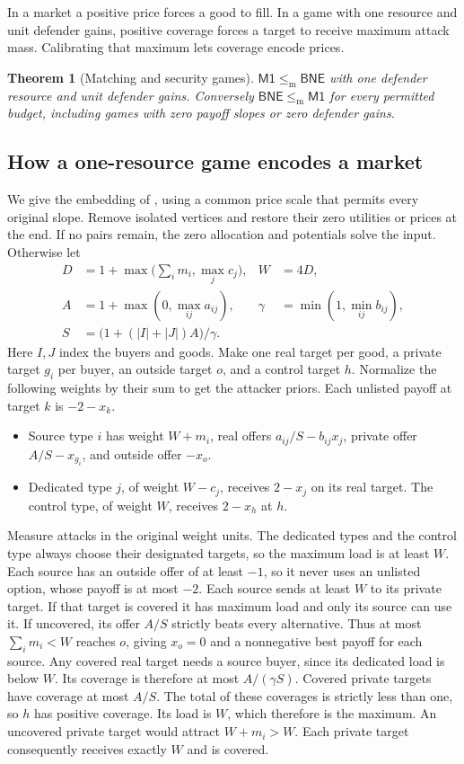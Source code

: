 \documentclass[11pt]{article}
\newtheorem{theorem}{Theorem}[section]
\newcommand{\Market}{\mathsf{M1}}
\newcommand{\BNE}{\mathsf{BNE}}
\newcommand{\dd}{\mathrel{\leq_{\mathrm m}}}
\begin{document}
In a market a positive price forces a good to fill. In a game with one
resource and unit defender gains, positive coverage forces a target to
receive maximum attack mass. Calibrating that maximum lets coverage
encode prices.

\begin{theorem}[Matching and security games]\label{thm:bridge}
\(\Market\dd\BNE\) with one defender resource and unit defender gains.
Conversely \(\BNE\dd\Market\) for every permitted budget, including games
with zero payoff slopes or zero defender gains.
\end{theorem}

\subsection{How a one-resource game encodes a market}
We give the embedding of \cite[Theorem~3.16]{book}, using a common price
scale that permits every original slope. Remove isolated vertices and
restore their zero utilities or prices at the end. If no pairs remain,
the zero allocation and potentials solve the input. Otherwise let
\begin{align*}
 D&=1+\max\bigl(\textstyle\sum_i m_i,\max_j c_j\bigr), &W&=4D,\\
 A&=1+\max(0,\max_{ij}a_{ij}), &\gamma&=\min(1,\min_{ij}b_{ij}),\\
 S&=\bigl(1+(|I|+|J|)A\bigr)/\gamma .
\end{align*}
Here \(I,J\) index the buyers and goods. Make one real target per good,
a private target \(g_i\) per buyer, an outside target \(o\), and a control
target \(h\). Normalize the following weights by their sum to get the
attacker priors. Each unlisted payoff at target \(k\) is \(-2-x_k\).
\begin{itemize}
\item Source type \(i\) has weight \(W+m_i\), real offers
\(a_{ij}/S-b_{ij}x_j\), private offer \(A/S-x_{g_i}\), and outside offer
\(-x_o\).
\item Dedicated type \(j\), of weight \(W-c_j\), receives \(2-x_j\) on
its real target. The control type, of weight \(W\), receives \(2-x_h\) at \(h\).
\end{itemize}
Measure attacks in the original weight units. The dedicated types and the
control type always choose their designated targets, so the maximum load is
at least \(W\). Each source has an outside offer of at least \(-1\), so
it never uses an unlisted option, whose payoff is at most \(-2\).
Each source sends at least \(W\) to its private target. If that target
is covered it has maximum load and only its source can use it.
If uncovered, its offer \(A/S\) strictly beats every alternative. Thus at
most \(\sum_i m_i<W\) reaches \(o\), giving \(x_o=0\) and a nonnegative
best payoff for each source. Any covered real target needs a source buyer,
since its dedicated load is below \(W\). Its coverage is therefore at most
\(A/(\gamma S)\). Covered private targets have coverage at most \(A/S\).
The total of these coverages is strictly less than one, so \(h\) has
positive coverage. Its load is \(W\), which therefore is the maximum.
An uncovered private target would attract \(W+m_i>W\). Each private
target consequently receives exactly \(W\) and is covered.
\end{document}
